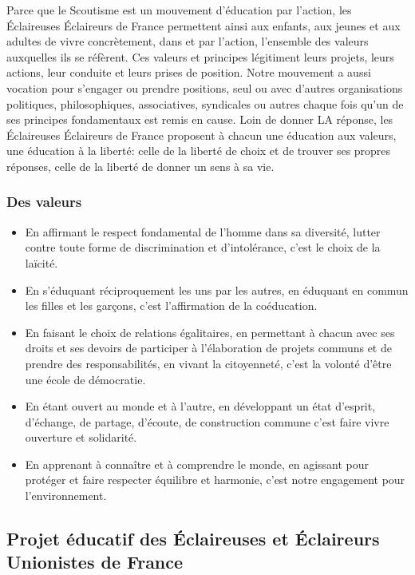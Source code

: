 \documentclass[titlepage,11pt,a4paper]{article}
\begin{document}
Parce que le Scoutisme est un mouvement d’éducation par l’action, les Éclaireuses
Éclaireurs de France permettent ainsi aux enfants, aux jeunes et aux adultes de vivre
concrètement, dans et par l’action, l’ensemble des valeurs auxquelles ils se réfèrent. Ces
valeurs et principes légitiment leurs projets, leurs actions, leur conduite et leurs
prises de position. Notre mouvement a aussi vocation pour s’engager ou prendre positions,
seul ou avec d’autres organisations politiques, philosophiques, associatives, syndicales
ou autres chaque fois qu’un de ses principes fondamentaux est remis en cause. Loin de
donner LA réponse, les Éclaireuses Éclaireurs de France proposent à chacun une éducation
aux valeurs, une éducation à la liberté: celle de la liberté de choix et de trouver ses
propres réponses, celle de la liberté de donner un sens à sa vie.

\subsubsection*{Des valeurs}

\begin{itemize}
   \item En affirmant le respect fondamental de l’homme dans sa diversité, lutter contre toute
forme de discrimination et d’intolérance, c’est le choix de la laïcité.
   \item En s’éduquant réciproquement les uns par les autres, en éduquant en commun les filles et
les garçons, c’est l’affirmation de la coéducation.
   \item En faisant le choix de relations égalitaires, en permettant à chacun avec ses droits et
ses devoirs de participer à l’élaboration de projets communs et de prendre des
responsabilités, en vivant la citoyenneté, c’est la volonté d’être une école de
démocratie.
   \item En étant ouvert au monde et à l’autre, en développant un état d’esprit, d’échange, de
partage, d’écoute, de construction commune c’est faire vivre ouverture et solidarité.
   \item En apprenant à connaître et à comprendre le monde, en agissant pour protéger et faire
respecter équilibre et harmonie, c’est notre engagement pour l’environnement.
\end{itemize}


\clearpage
\subsection{\label{peeeudf}Projet éducatif des Éclaireuses et Éclaireurs Unionistes de France}
\end{document}
